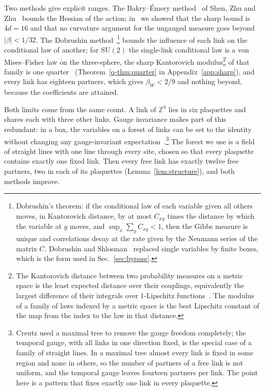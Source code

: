 \documentclass[aps,prd,twocolumn,superscriptaddress,nofootinbib,longbibliography,floatfix,amsmath,amssymb,10pt]{revtex4-2}
\theoremstyle{definition}
\theoremstyle{remark}
\newcommand{\Z}{\mathbb{Z}}
\newcommand{\SU}{\mathrm{SU}}
\begin{document}
Two methods give explicit ranges. The Bakry--\'Emery
method~\cite{BE85,BGL14} of Shen, Zhu and Zhu~\cite{SZZ23} bounds the
Hessian of the action; in~\cite{BB26a} we showed that the sharp bound is
$4d=16$ and that no curvature argument for the ungauged measure goes beyond
$|\beta|<1/32$. The Dobrushin method~\cite{Dob68,Dob70}\footnote{Dobrushin's theorem: if the conditional law of each variable given all others moves, in Kantorovich distance, by at most $C_{xy}$ times the distance by which the variable at $y$ moves, and $\sup_x\sum_yC_{xy}<1$, then the Gibbs measure is unique and correlations decay at the rate given by the Neumann series of the matrix $C$. Dobrushin and Shlosman~\cite{DS85} replaced single variables by finite boxes, which is the form used in Sec.~\ref{sec:bypass}.} bounds the influence
of each link on the conditional law of another; for $\SU(2)$ the single-link
conditional law is a von Mises--Fisher law on the three-sphere, the sharp
Kantorovich modulus\footnote{The Kantorovich distance between two probability measures on a metric space is the least expected distance over their couplings, equivalently the largest difference of their integrals over $1$-Lipschitz functions~\cite{Vil09}. The modulus of a family of laws indexed by a metric space is the best Lipschitz constant of the map from the index to the law in that distance.} of that family is one quarter~\cite{BB26a} (Theorem~\ref{q-thm:quarter} in Appendix~\ref{app:sharp}), and
every link has eighteen partners, which gives $\beta_W<2/9$ and nothing
beyond, because the coefficients are attained.

Both limits come from the same count. A link of $\Z^4$ lies in six
plaquettes and shares each with three other links. Gauge invariance makes
part of this redundant: in a box, the variables on a forest of links can be
set to the identity without changing any gauge-invariant
expectation~\cite{Cre77}.\footnote{Creutz used a maximal tree to remove the
gauge freedom completely; the temporal gauge, with all links in one
direction fixed, is the special case of a family of straight lines. In a
maximal tree almost every link is fixed in some region and none in others,
so the number of partners of a free link is not uniform, and the temporal
gauge leaves fourteen partners per link. The point here is a pattern that
fixes exactly one link in every plaquette.} The forest we use is a field of
straight lines with one line through every site, chosen so that every
plaquette contains exactly one fixed link. Then every free link has exactly
twelve free partners, two in each of its plaquettes
(Lemma~\ref{lem:structure}), and both methods improve.
\end{document}
